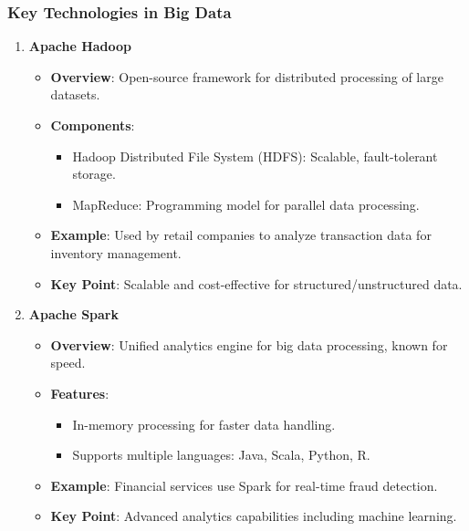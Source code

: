 \documentclass[aspectratio=169]{beamer}
\begin{document}
\begin{frame}
    \frametitle{Key Technologies in Big Data}
    \begin{enumerate}
        \item \textbf{Apache Hadoop}
            \begin{itemize}
                \item \textbf{Overview}: Open-source framework for distributed processing of large datasets.
                \item \textbf{Components}:
                    \begin{itemize}
                        \item Hadoop Distributed File System (HDFS): Scalable, fault-tolerant storage.
                        \item MapReduce: Programming model for parallel data processing.
                    \end{itemize}
                \item \textbf{Example}: Used by retail companies to analyze transaction data for inventory management.
                \item \textbf{Key Point}: Scalable and cost-effective for structured/unstructured data.
            \end{itemize}

        \item \textbf{Apache Spark}
            \begin{itemize}
                \item \textbf{Overview}: Unified analytics engine for big data processing, known for speed.
                \item \textbf{Features}:
                    \begin{itemize}
                        \item In-memory processing for faster data handling.
                        \item Supports multiple languages: Java, Scala, Python, R.
                    \end{itemize}
                \item \textbf{Example}: Financial services use Spark for real-time fraud detection.
                \item \textbf{Key Point}: Advanced analytics capabilities including machine learning.
            \end{itemize}
    \end{enumerate}
\end{frame}
\end{document}
